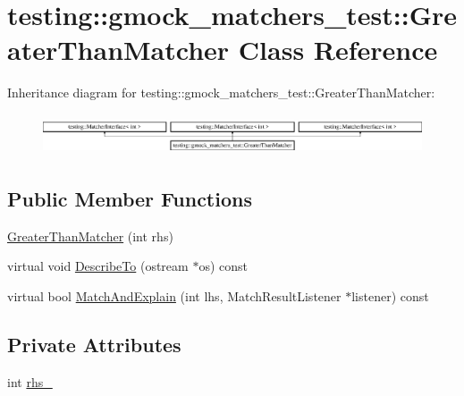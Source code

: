 \hypertarget{classtesting_1_1gmock__matchers__test_1_1_greater_than_matcher}{}\section{testing\+::gmock\+\_\+matchers\+\_\+test\+::Greater\+Than\+Matcher Class Reference}
\label{classtesting_1_1gmock__matchers__test_1_1_greater_than_matcher}
Inheritance diagram for testing\+::gmock\+\_\+matchers\+\_\+test\+::Greater\+Than\+Matcher\+:\begin{figure}[H]
\begin{center}
\leavevmode
\includegraphics[height=1.220044cm]{df/da1/classtesting_1_1gmock__matchers__test_1_1_greater_than_matcher}
\end{center}
\end{figure}
\subsection*{Public Member Functions}
\begin{DoxyCompactItemize}
\item 
\mbox{\hyperlink{classtesting_1_1gmock__matchers__test_1_1_greater_than_matcher_a605c50137599a1dba0701bbd735bf1e8}{Greater\+Than\+Matcher}} (int rhs)
\item 
virtual void \mbox{\hyperlink{classtesting_1_1gmock__matchers__test_1_1_greater_than_matcher_a49ea904382d0f5b80ccf622423ab0d94}{Describe\+To}} (ostream $\ast$os) const
\item 
virtual bool \mbox{\hyperlink{classtesting_1_1gmock__matchers__test_1_1_greater_than_matcher_a85a583852003638507d872238bcf7c0f}{Match\+And\+Explain}} (int lhs, Match\+Result\+Listener $\ast$listener) const
\end{DoxyCompactItemize}
\subsection*{Private Attributes}
\begin{DoxyCompactItemize}
\item 
int \mbox{\hyperlink{classtesting_1_1gmock__matchers__test_1_1_greater_than_matcher_aca7d0e0d9127f5c72310fda7be4d5d6c}{rhs\+\_\+}}
\end{DoxyCompactItemize}


